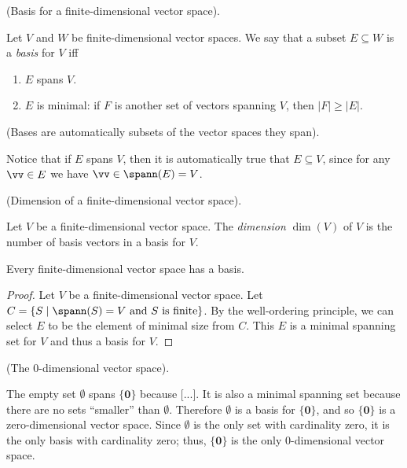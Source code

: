 \begin{defn}
    (Basis for a finite-dimensional vector space). 
    
    Let $V$ and $W$ be finite-dimensional vector spaces. We say that a subset $E \subseteq W$ is a \textit{basis} for $V$ iff
    
    \begin{enumerate}
        \item $E$ spans $V$.
        \item $E$ is minimal: if $F$ is another set of vectors spanning $V$, then $|F| \geq |E|$.
    \end{enumerate}
\end{defn}

\begin{remark}
    (Bases are automatically subsets of the vector spaces they span).

    Notice that if $E$ spans $V$, then it is automatically true that $E \subseteq V$, since for any $\vv \in E$ we have ${\vv \in \spann(E) = V}$.
\end{remark}

\begin{defn}
    (Dimension of a finite-dimensional vector space).
    
    Let $V$ be a finite-dimensional vector space. The \textit{dimension} $\dim(V)$ of $V$ is the number of basis vectors in a basis for $V$.
\end{defn}

\begin{theorem}
    Every finite-dimensional vector space has a basis.
\end{theorem}

\begin{proof}
    Let $V$ be a finite-dimensional vector space. Let $C = \{S \mid \spann(S) = V \text{ and $S$ is finite} \}$. By the well-ordering principle, we can select $E$ to be the element of minimal size from $C$. This $E$ is a minimal spanning set for $V$ and thus a basis for $V$.
\end{proof}

\begin{remark}
\label{ch::lin_alg::rmk::zero_dim_vector_space}
    (The $0$-dimensional vector space). 
    
    The empty set $\emptyset$ spans $\{\mathbf{0}\}$ because [...]. It is also a minimal spanning set because there are no sets ``smaller'' than $\emptyset$. Therefore $\emptyset$ is a basis for $\{\mathbf{0}\}$, and so $\{\mathbf{0}\}$ is a zero-dimensional vector space. Since $\emptyset$ is the only set with cardinality zero, it is the only basis with cardinality zero; thus, $\{\mathbf{0}\}$ is the only $0$-dimensional vector space.
\end{remark}

